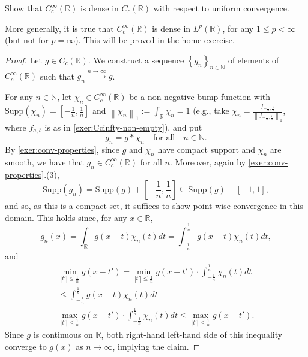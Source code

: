 \documentclass[12pt, draft,reqno,a4paper, twoside]{amsproc}
\newcommand{\supp}{\mathrm{Supp}}
\newcommand{\dbN}{\mathbb N}
\newcommand{\dbR}{\mathbb R}
\newcommand{\set}[1]{\left\{{#1}\right\}}
\newcommand{\norm}[1]{\left\|#1\right\|}
\newcommand{\abs}[1]{\left|#1\right|}
\begin{document}
\begin{exer}Show that $C_c^\infty(\dbR)$ is dense in $C_c(\dbR)$ with respect to uniform convergence.
\end{exer}
\begin{rem}More generally, it is true that $C_c^\infty(\dbR)$ is dense in $L^p(\dbR)$, for any $1\le p<\infty$ (but not for $p=\infty$). This will be proved in the home exercise.
\end{rem}
\begin{proof}
Let $g\in C_c(\dbR)$. We construct a sequence $\set{g_n}_{n\in \dbN}$ of elements of $C_c^\infty(\dbR)$ such that $g_n\xrightarrow{n\to\infty}g$.

For any $n\in\dbN$, let $\chi_n\in C_c^\infty(\dbR)$ be a non-negative bump function with $\supp(\chi_n)=\left[-\frac{1}{n},\frac{1}{n}\right]$ and $\norm{\chi_n}_1:=\int_\dbR\chi_n=1$ (e.g., take $\chi_n=\frac{f_{-\frac{1}{n},\frac{1}{n}}}{\norm{f_{-\frac{1}{n},\frac{1}{n}}}_1}$, where $f_{a,b}$ is as in \autoref{exer:Ccinfty-non-empty}), and put \[g_n=g\ast \chi_n\quad\text{for all}\quad n\in\dbN.\]
By \autoref{exer:conv-properties}, since $g$ and $\chi_n$ have compact support and $\chi_n$ are smooth, we have that $g_n\in C_c^\infty(\dbR)$ for all $n$. Moreover, again by \autoref{exer:conv-properties}.(3), \[\supp(g_n)=\supp(g)+\left[-\frac{1}{n},\frac{1}{n}\right]\subseteq\supp(g)+\left[-1,1\right],\]
and so, as this is a compact set, it suffices to show point-wise convergence in this domain. This holds since, for any $x\in\dbR$, 
\[g_n(x)=\int_\dbR g(x-t)\chi_n(t)dt=\int_{-\frac{1}{n}}^{\frac{1}{n}}g(x-t)\chi_n(t)dt,\]
and
\begin{multline*}
\min_{\abs{t'}\le \frac{1}{n}}g(x-t')=\min_{\abs{t'}\le \frac{1}{n}}g(x-t')\cdot \int_{-\frac{1}{n}}^{\frac{1}{n}}\chi_n(t)dt\\
\le \int_{-\frac{1}{n}}^{\frac{1}{n}} g(x-t)\chi_n(t)dt\\
\max_{\abs{t'}\le \frac{1}{n}}g(x-t')\cdot \int_{-\frac{1}{n}}^{\frac{1}{n}}\chi_n(t)dt\le \max_{\abs{t'}\le \frac{1}{n}}g(x-t').
\end{multline*}
Since $g$ is continuous on $\dbR$, both right-hand left-hand side of this inequality converge to $g(x)$ as $n\to \infty$, implying the claim.
\end{proof}
\end{document}
